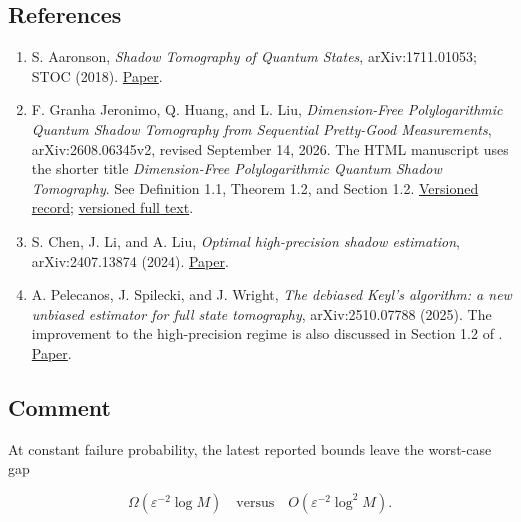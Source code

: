 \subsection*{References}

\begin{enumerate}[label={},leftmargin=4.8em,labelsep=0.5em]
  \footnotesize
  \item[\textup{[Aaronson18]}]\label{ref:428e-aaronson18}
  S. Aaronson, \emph{Shadow Tomography of Quantum States}, arXiv:1711.01053; STOC (2018). \href{https://arxiv.org/abs/1711.01053}{Paper}.

  \item[\textup{[Jeronimo26]}]\label{ref:428e-jeronimo26}
  F. Granha Jeronimo, Q. Huang, and L. Liu, \emph{Dimension-Free Polylogarithmic Quantum Shadow Tomography from Sequential Pretty-Good Measurements}, arXiv:2608.06345v2, revised September 14, 2026. The HTML manuscript uses the shorter title \emph{Dimension-Free Polylogarithmic Quantum Shadow Tomography}. See Definition 1.1, Theorem 1.2, and Section 1.2. \href{https://arxiv.org/abs/2608.06345v2}{Versioned record}; \href{https://arxiv.org/html/2608.06345v2}{versioned full text}.

  \item[\textup{[Chen24]}]\label{ref:428e-chen24}
  S. Chen, J. Li, and A. Liu, \emph{Optimal high-precision shadow estimation}, arXiv:2407.13874 (2024). \href{https://arxiv.org/abs/2407.13874}{Paper}.

  \item[\textup{[Pelecanos25]}]\label{ref:428e-pelecanos25}
  A. Pelecanos, J. Spilecki, and J. Wright, \emph{The debiased Keyl's algorithm: a new unbiased estimator for full state tomography}, arXiv:2510.07788 (2025). The improvement to the high-precision regime is also discussed in Section 1.2 of . \href{https://arxiv.org/abs/2510.07788}{Paper}.
\end{enumerate}

\subsection*{Comment}

At constant failure probability, the latest reported bounds leave the worst-case gap

\begin{equation}
\Omega(\varepsilon^{-2}\log M)
\quad\text{versus}\quad
O(\varepsilon^{-2}\log^2 M).
\label{eq:428e-7}
\end{equation}

